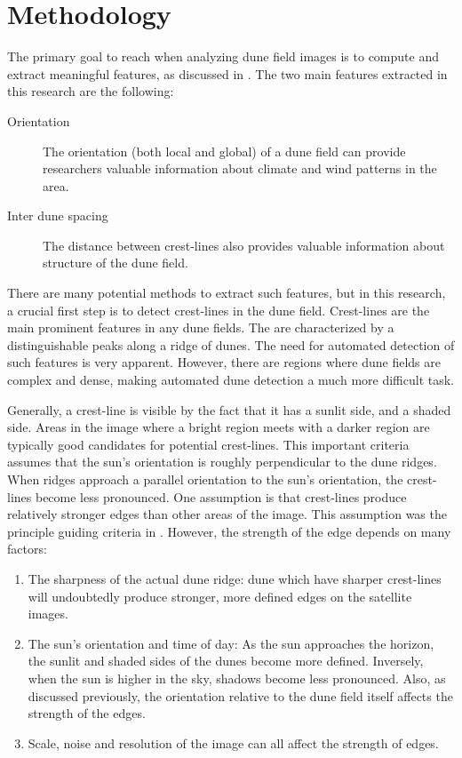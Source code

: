 \section{Methodology} \label{sec:methodology}
The primary goal to reach when analyzing dune field images is to compute and extract meaningful features, as discussed in \cite{ewing-kocurek-lake-2006,ewing-peyret-kocurek-bourke-2010}. The two main features extracted in this research are the following:

 \begin{description}
 	\item [Orientation] The orientation (both local and global) of a dune field can provide researchers valuable information about climate and wind patterns in the area.
 	\item [Inter dune spacing] The distance between crest-lines also provides valuable information about structure of the dune field.
 \end{description}
 
 There are many potential methods to extract such features, but in this research, a crucial first step is to detect crest-lines in the dune field. Crest-lines are the main prominent features in any dune fields. The are characterized by a distinguishable peaks along a ridge of dunes. The need for automated detection of such features is very apparent. However, there are regions where dune fields are complex and dense, making automated dune detection a much more difficult task.
 
 Generally, a crest-line is visible by the fact that it has a sunlit side, and a shaded side. Areas in the image where a bright region meets with a darker region are typically good candidates for potential crest-lines. This important criteria assumes that the sun's orientation is roughly perpendicular to the dune ridges. When ridges approach a parallel orientation to the sun's orientation, the crest-lines become less pronounced. One assumption is that crest-lines produce relatively stronger edges than other areas of the image. This assumption was the principle guiding criteria in \cite{2015_automated_mapping_of_linear_dunefield}. However, the strength of the edge depends on many factors:
 
  \begin{enumerate}
	\item The sharpness of the actual dune ridge: dune which have sharper crest-lines will undoubtedly produce stronger, more defined edges on the satellite images.
	\item The sun's orientation and time of day: As the sun approaches the horizon, the sunlit and shaded sides of the dunes become more defined. Inversely, when the sun is higher in the sky, shadows become less pronounced. Also, as discussed previously, the orientation relative to the dune field itself affects the strength of the edges.
	\item Scale, noise and resolution of the image can all affect the strength of edges.
  \end{enumerate}

